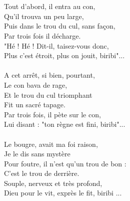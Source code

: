 \\\\Tout d’abord, il entra au con,
\\Qu’il trouva un peu large,
\\Puis dans le trou du cul, sans façon,
\\Par trois fois il décharge.
\\"Hé ! Hé ! Dit-il, taisez-vous donc,
\\Plus c’est étroit, plus on jouit, biribi"...
\\\\A cet arrêt, si bien, pourtant,
\\Le con bava de rage,
\\Et le trou du cul triomphant
\\Fit un sacré tapage.
\\Par trois fois, il pète sur le con,
\\Lui disant : "ton règne est fini, biribi"...
\\\\Le bougre, avait ma foi raison,
\\Je le dis sans mystère
\\Pour foutre, il n’est qu’un trou de bon :
\\C’est le trou de derrière.
\\Souple, nerveux et très profond,
\\Dieu pour le vit, exprès le fit, biribi ...

\breakpage